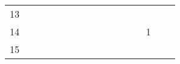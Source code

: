 \documentclass[a4paper]{exam}
\begin{document}
\begin{enumerate}
\begin{itemize}
\begin{table}[H]
\begin{tabular}{cccccccccccccccc}
				\multicolumn{1}{c|}{13} & \multicolumn{1}{c|}{} & \multicolumn{1}{c|}{} & \multicolumn{1}{c|}{} & \multicolumn{1}{c|}{} & \multicolumn{1}{c|}{} & \multicolumn{1}{c|}{} & \multicolumn{1}{c|}{} & \multicolumn{1}{c|}{} & \multicolumn{1}{c|}{} & \multicolumn{1}{c|}{} & \multicolumn{1}{c|}{} & \multicolumn{1}{c|}{} & \multicolumn{1}{c|}{} & \multicolumn{1}{c|}{} & \multicolumn{1}{c|}{} \\ \cline{2-16} 
				\multicolumn{1}{c|}{14} & \multicolumn{1}{c|}{} & \multicolumn{1}{c|}{} & \multicolumn{1}{c|}{} & \multicolumn{1}{c|}{} & \multicolumn{1}{c|}{} & \multicolumn{1}{c|}{} & \multicolumn{1}{c|}{} & \multicolumn{1}{c|}{} & \multicolumn{1}{c|}{} & \multicolumn{1}{c|}{} & \multicolumn{1}{c|}{} & \multicolumn{1}{c|}{} & \multicolumn{1}{c|}{1} & \multicolumn{1}{c|}{} & \multicolumn{1}{c|}{} \\ \cline{2-16} 
				\multicolumn{1}{c|}{15} & \multicolumn{1}{c|}{} & \multicolumn{1}{c|}{} & \multicolumn{1}{c|}{} & \multicolumn{1}{c|}{} & \multicolumn{1}{c|}{} & \multicolumn{1}{c|}{} & \multicolumn{1}{c|}{} & \multicolumn{1}{c|}{} & \multicolumn{1}{c|}{} & \multicolumn{1}{c|}{} & \multicolumn{1}{c|}{} & \multicolumn{1}{c|}{} & \multicolumn{1}{c|}{} & \multicolumn{1}{c|}{} & \multicolumn{1}{c|}{} \\ \cline{2-16} 
			\end{tabular}
		\end{table}
	\end{itemize}
\end{enumerate}




\end{document}
